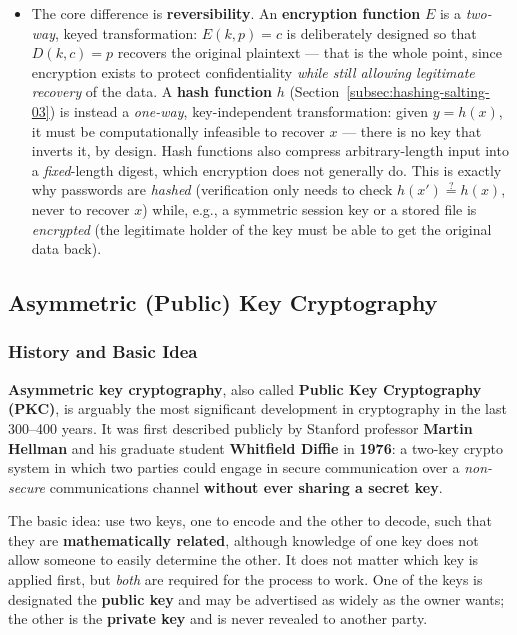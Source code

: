 \documentclass[12pt, a4paper]{article}
\begin{document}
\begin{itemize}
    \item[(d)] The core difference is \textbf{reversibility}. An \textbf{encryption function} $E$ is a \emph{two-way}, keyed transformation: $E(k,p)=c$ is deliberately designed so that $D(k,c)=p$ recovers the original plaintext --- that is the whole point, since encryption exists to protect confidentiality \emph{while still allowing legitimate recovery} of the data. A \textbf{hash function} $h$ (Section~\ref{subsec:hashing-salting-03}) is instead a \emph{one-way}, key-independent transformation: given $y=h(x)$, it must be computationally infeasible to recover $x$ --- there is no key that inverts it, by design. Hash functions also compress arbitrary-length input into a \emph{fixed}-length digest, which encryption does not generally do. This is exactly why passwords are \emph{hashed} (verification only needs to check $h(x')\stackrel{?}{=}h(x)$, never to recover $x$) while, e.g., a symmetric session key or a stored file is \emph{encrypted} (the legitimate holder of the key must be able to get the original data back).
\end{itemize}

\subsection{Asymmetric (Public) Key Cryptography}
\label{subsec:pkc-basic-04}

\subsubsection{History and Basic Idea}
\textbf{Asymmetric key cryptography}, also called \textbf{Public Key Cryptography (PKC)}, is arguably the most significant development in cryptography in the last 300--400 years. It was first described publicly by Stanford professor \textbf{Martin Hellman} and his graduate student \textbf{Whitfield Diffie} in \textbf{1976}: a two-key crypto system in which two parties could engage in secure communication over a \emph{non-secure} communications channel \textbf{without ever sharing a secret key}.

The basic idea: use two keys, one to encode and the other to decode, such that they are \textbf{mathematically related}, although knowledge of one key does not allow someone to easily determine the other. It does not matter which key is applied first, but \emph{both} are required for the process to work. One of the keys is designated the \textbf{public key} and may be advertised as widely as the owner wants; the other is the \textbf{private key} and is never revealed to another party.
\end{document}

